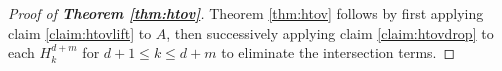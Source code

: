\documentclass[a4,fleqn]{article}
\begin{document}
\begin{proof}[Proof of \textnormal{\textbf{Theorem \ref{thm:htov}}}]
Theorem \ref{thm:htov} follows by first applying claim \ref{claim:htovlift} to $A$, then successively applying claim \ref{claim:htovdrop} to each $H_k^{d+m}$ for $d+1\leq k \leq d+m$ to eliminate the intersection terms.
\end{proof}
%
%
%
%
%
%
%
%
%
%
%
%
%
\end{document}
